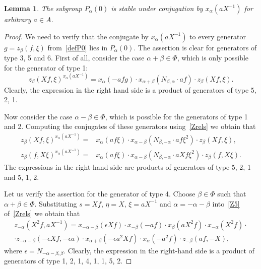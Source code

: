 \documentclass[oneside, 8pt]{amsart}
\newtheorem{lemma}{Lemma}
\theoremstyle{remark}
\theoremstyle{definition}
\numberwithin{equation}{section}
\begin{document}
\begin{lemma}\label{P0_conj} The subgroup $P_\alpha(0)$ is stable under conjugation by $x_\alpha(aX^{-1})$ for arbitrary $a\in A$. \end{lemma}
\begin{proof} We need to verify that the conjugate by $x_\alpha(aX^{-1})$ to every generator $g = z_\beta(f, \xi)$ from~\cref{defP0} lies in $P_\alpha(0)$. 
The assertion is clear for generators of type 3, 5 and 6.
First of all, consider the case $\alpha + \beta \in \Phi$, which is only possible for the generator of type 1:
\begin{equation}\label{eq:Zconj1} z_{\beta}(Xf, \xi) ^ {x_{\alpha}(aX^{-1})} = x_{\alpha} (- afg) \cdot x_{\alpha+\beta} (N_{\beta, \alpha}\cdot af) \cdot z_{\beta}(Xf, \xi). \end{equation}
Clearly, the expression in the right hand side is a product of generators of type 5, 2, 1. 

Now consider the case $\alpha - \beta \in \Phi$, which is possible for the generators of type 1 and 2.
Computing the conjugates of these generators using~\cref{Zrels} we obtain that
\begin{align} z_{\beta}(Xf, \xi) ^ {x_{\alpha}(aX^{-1})} = &  x_{\alpha} (af\xi) \cdot x_{\alpha-\beta} (N_{\beta,-\alpha}\cdot af\xi^2) \cdot z_{\beta}(Xf, \xi), \label{eq:Zconj2} \\
z_{\beta}(f, X\xi) ^ {x_{\alpha}(aX^{-1})} = & x_{\alpha} (af\xi) \cdot x_{\alpha-\beta} (N_{\beta,-\alpha}\cdot aXf\xi^2) \cdot z_{\beta}(f, X\xi). \nonumber \end{align}
The expressions in the right-hand side are products of generators of type 5, 2, 1 and 5, 1, 2.

Let us verify the assertion for the generator of type 4.
Choose $\beta\in \Phi$ such that $\alpha+\beta \in \Phi$. 
Substituting $s = Xf$, $\eta = X$, $\xi = aX^{-1}$ and $\alpha = -\alpha - \beta$ into~\eqref{Z5} of~\cref{Zrels} we obtain that
\begin{multline} \label{eq:Zconj3} z_{-\alpha}(X^2f, aX^{-1}) = x_{-\alpha-\beta}(\epsilon Xf) \cdot x_{-\beta}(-af) \cdot x_{\beta}(aX^2 f) \cdot x_{-\alpha}(X^2f) \cdot \\
 \cdot z_{-\alpha-\beta}(-\epsilon Xf, -\epsilon a) \cdot x_{\alpha+\beta}(-\epsilon a^2 Xf) \cdot x_{\alpha}(- a^2 f) \cdot z_{-\beta}(a f, -X), \end{multline}
where $\epsilon = N_{-\alpha-\beta,\beta}$. 
Clearly, the expression in the right-hand side is a product of generators of type 1, 2, 1, 4, 1, 1, 5, 2.


\end{proof}
\end{document}
